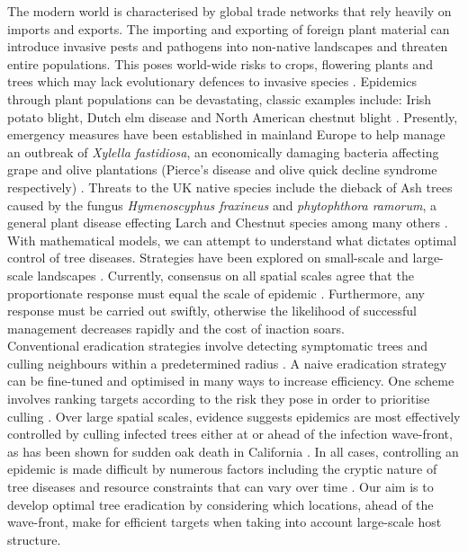 The modern world is characterised by global trade networks that rely heavily on imports and exports. The importing and exporting of foreign plant material can introduce invasive pests and pathogens into non-native landscapes and threaten entire populations. This poses world-wide risks to crops, flowering plants and trees which may lack evolutionary defences to invasive species \cite{doi:10.1002/9781444329988.ch8}. Epidemics through plant populations can be devastating, classic examples include: Irish potato blight, Dutch elm disease \cite{doi:10.1111/j.1365-3059.2010.02391.x} and North American chestnut blight \cite{doi:10.1002/9780470535486.ch7}. Presently, emergency measures have been established in mainland Europe to help manage an outbreak of \textit{Xylella fastidiosa}, an economically damaging bacteria affecting grape and olive plantations (Pierce's disease and olive quick decline syndrome respectively) \cite{simpson2000genome, doi:10.1146/annurev-phyto-080417-045849}. Threats to the UK native species include the dieback of Ash trees caused by the fungus \textit{Hymenoscyphus fraxineus} \cite{ash-dieback-costs} and \textit{phytophthora ramorum}, a general plant disease effecting Larch and Chestnut species among many others \cite{p.ramourum}.\\

With mathematical models, we can attempt to understand what dictates optimal control of tree diseases. Strategies have been explored on small-scale \cite{risk-potential-control, WEBIDEMICS} and large-scale landscapes \cite{large-scale-control, large-scale-control2}. Currently, consensus on all spatial scales agree that the proportionate response must equal the scale of epidemic \cite{control-scale-matching}. Furthermore, any response must be carried out swiftly, otherwise the likelihood of successful management decreases rapidly and the cost of inaction soars.\\

Conventional eradication strategies involve detecting symptomatic trees and culling neighbours within a predetermined radius \cite{WEBIDEMICS}. A naive eradication strategy can be fine-tuned and optimised in many ways to increase efficiency. One scheme involves ranking targets according to the risk they pose in order to prioritise culling \cite{risk-potential-control}. Over large spatial scales, evidence suggests epidemics are most effectively controlled by culling infected trees either at or ahead of the infection wave-front, as has been shown for sudden oak death in California \cite{large-scale-control}. In all cases, controlling an epidemic is made difficult by numerous factors including the cryptic nature of tree diseases and resource constraints that can vary over time \cite{control-theory, control-theory-application}. Our aim is to develop optimal tree eradication by considering which locations, ahead of the wave-front, make for efficient targets when taking into account large-scale host structure.\\

